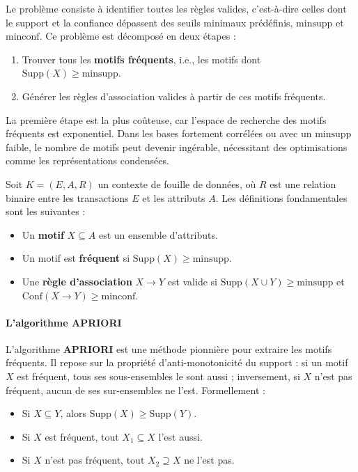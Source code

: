 \documentclass[a4paper,14pt]{article}
\begin{document}
        Le problème consiste à identifier toutes les règles valides, c’est-à-dire celles dont le support et la confiance dépassent des seuils minimaux prédéfinis, \( \text{minsupp} \) et \( \text{minconf} \). Ce problème est décomposé en deux étapes \cite{HGN00} :
        \begin{enumerate}
            \item Trouver tous les \textbf{motifs fréquents}, i.e., les motifs dont \( \text{Supp}(X) \geq \text{minsupp} \).
            \item Générer les règles d’association valides à partir de ces motifs fréquents.
        \end{enumerate}
        
        La première étape est la plus coûteuse, car l’espace de recherche des motifs fréquents est exponentiel. Dans les bases fortement corrélées ou avec un \( \text{minsupp} \) faible, le nombre de motifs peut devenir ingérable, nécessitant des optimisations comme les représentations condensées.
        
        \label{sec:def_principes}
        
        Soit \( K = (E, A, R) \) un contexte de fouille de données, où \( R \) est une relation binaire entre les transactions \( E \) et les attributs \( A \). Les définitions fondamentales sont les suivantes :
        \begin{itemize}
            \item Un \textbf{motif} \( X \subseteq A \) est un ensemble d’attributs.
            \item Un motif est \textbf{fréquent} si \( \text{Supp}(X) \geq \text{minsupp} \).
            \item Une \textbf{règle d’association} \( X \rightarrow Y \) est valide si \( \text{Supp}(X \cup Y) \geq \text{minsupp} \) et \( \text{Conf}(X \rightarrow Y) \geq \text{minconf} \).
        \end{itemize}
        
        \paragraph{L’algorithme APRIORI}
        
        L’algorithme \textbf{APRIORI} \cite{AS94} est une méthode pionnière pour extraire les motifs fréquents. Il repose sur la propriété d’anti-monotonicité du support : si un motif \( X \) est fréquent, tous ses sous-ensembles le sont aussi ; inversement, si \( X \) n’est pas fréquent, aucun de ses sur-ensembles ne l’est. Formellement :
        \begin{itemize}
            \item Si \( X \subseteq Y \), alors \( \text{Supp}(X) \geq \text{Supp}(Y) \).
            \item Si \( X \) est fréquent, tout \( X_1 \subseteq X \) l’est aussi.
            \item Si \( X \) n’est pas fréquent, tout \( X_2 \supseteq X \) ne l’est pas.
        \end{itemize}
        
\end{document}
